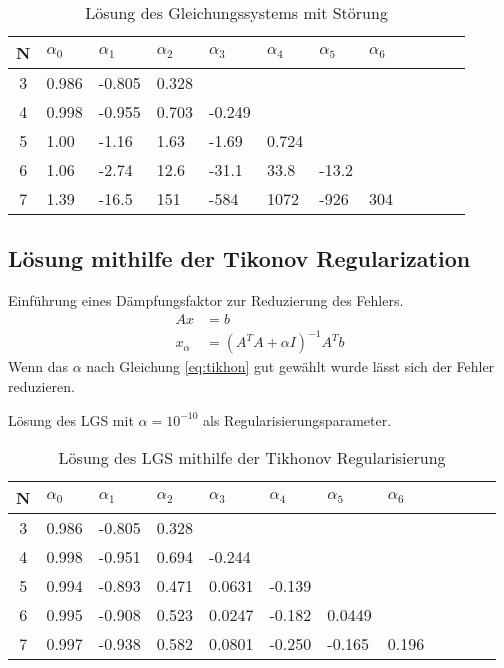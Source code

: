 \documentclass{beamer}
\begin{document}
  \begin{frame}
    \centering    
    \begin{table}[htbp]
    \tiny   
    \renewcommand{\arraystretch}{1.5}
    \begin{tabularx}{\textwidth}{|c|X|X|X|X|X|X|X|X|X|X|X|}
        \hline    
        N & $\alpha_0$&$\alpha_1$&$\alpha_2$&$\alpha_3$&$\alpha_4$&$\alpha_5$&$\alpha_6$ \\\hline
        3 & 0.986 & -0.805 & 0.328 &&&&\\\hline
        4 & 0.998 & -0.955 & 0.703 & -0.249 &&&\\\hline
        5 & 1.00 & -1.16 & 1.63 & -1.69 & 0.724 &&\\\hline
        6 & 1.06 & -2.74 & 12.6 & -31.1 & 33.8 & -13.2 &\\\hline
        7 & 1.39 & -16.5 & 151 & -584 & 1072 & -926 & 304 \\\hline
      
        \end{tabularx}
    \caption{Lösung des Gleichungssystems mit Störung}      
    \end{table}
  \end{frame}
  
  \subsection{Lösung mithilfe der Tikonov Regularization}
  \begin{frame}
    Einführung eines Dämpfungsfaktor zur Reduzierung des Fehlers.
    \begin{align}
      Ax& = b\\
      \label{eq:tikhon}
      x_\alpha &= \left(A^T A+\alpha I\right)^{-1}A^T b
    \end{align}
    Wenn das $\alpha$ nach Gleichung \ref{eq:tikhon} gut gewählt wurde lässt sich
    der Fehler reduzieren.
    \end{frame}
    
    \begin{frame}
    Lösung des LGS mit $\alpha=10^{-10}$ als Regularisierungsparameter.
    \centering    
    \begin{table}[htbp]
    \tiny   
    \renewcommand{\arraystretch}{1.5}
    \begin{tabularx}{\textwidth}{|c|X|X|X|X|X|X|X|X|X|X|X|}
        \hline    
        N & $\alpha_0$&$\alpha_1$&$\alpha_2$&$\alpha_3$&$\alpha_4$&$\alpha_5$&$\alpha_6$ \\\hline
        3 &0.986  &-0.805  &0.328 &&&& \\\hline
        4 &0.998  &-0.951  &0.694 &-0.244 &&& \\\hline
        5 &0.994  &-0.893  &0.471 &0.0631  &-0.139 && \\\hline
        6 &0.995  &-0.908  &0.523 &0.0247  &-0.182  &0.0449 & \\\hline
        7 &0.997  &-0.938  &0.582 &0.0801  &-0.250  &-0.165  &0.196  \\\hline
        \end{tabularx}
    \caption{Lösung des LGS mithilfe der Tikhonov Regularisierung}      
    \end{table}
  \end{frame}
\end{document}

